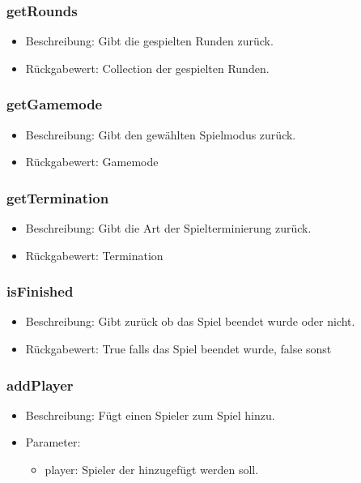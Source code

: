 \documentclass[a4paper]{scrreprt}
\begin{document}
	\subsubsection{getRounds}
	\begin{itemize}
		\item Beschreibung: Gibt die gespielten Runden zurück.
		\item Rückgabewert: Collection der gespielten Runden.
	\end{itemize}

	\subsubsection{getGamemode}
	\begin{itemize}
		\item Beschreibung: Gibt den gewählten Spielmodus zurück.
		\item Rückgabewert: Gamemode
	\end{itemize}

	\subsubsection{getTermination}
	\begin{itemize}
		\item Beschreibung: Gibt die Art der Spielterminierung zurück.
		\item Rückgabewert: Termination
	\end{itemize}

	\subsubsection{isFinished}
	\begin{itemize}
		\item Beschreibung: Gibt zurück ob das Spiel beendet wurde oder nicht.
		\item Rückgabewert: True falls das Spiel beendet wurde, false sonst
	\end{itemize}

	\subsubsection{addPlayer}
	\begin{itemize}
		\item Beschreibung: Fügt einen Spieler zum Spiel hinzu.
		\item Parameter:
		\begin{itemize}
			\item player: Spieler der hinzugefügt werden soll.
		\end{itemize}
	\end{itemize}
\end{document}
